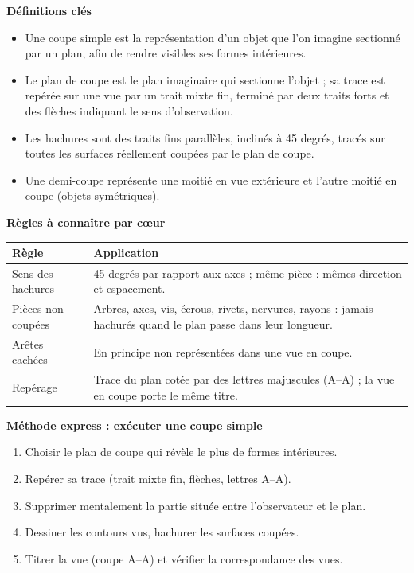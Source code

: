 \documentclass[11pt]{article}
\newcommand{\cle}[1]{{\popxbold\color{popdark}#1}}
\begin{document}
\begin{bilan}
\textbf{Définitions clés}
\begin{itemize}
\item Une \cle{coupe simple} est la représentation d'un objet que l'on imagine sectionné par un plan, afin de rendre visibles ses formes intérieures.
\item Le \cle{plan de coupe} est le plan imaginaire qui sectionne l'objet ; sa trace est repérée sur une vue par un trait mixte fin, terminé par deux traits forts et des flèches indiquant le sens d'observation.
\item Les \cle{hachures} sont des traits fins parallèles, inclinés à 45 degrés, tracés sur toutes les surfaces réellement coupées par le plan de coupe.
\item Une \cle{demi-coupe} représente une moitié en vue extérieure et l'autre moitié en coupe (objets symétriques).
\end{itemize}

\textbf{Règles à connaître par cœur}
\begin{center}
\begin{tabularx}{\linewidth}{|l|X|}\hline
\rowcolor{popblueL} \textbf{Règle} & \textbf{Application} \\ \hline
Sens des hachures & 45 degrés par rapport aux axes ; même pièce : mêmes direction et espacement. \\ \hline
Pièces non coupées & Arbres, axes, vis, écrous, rivets, nervures, rayons : jamais hachurés quand le plan passe dans leur longueur. \\ \hline
Arêtes cachées & En principe non représentées dans une vue en coupe. \\ \hline
Repérage & Trace du plan cotée par des lettres majuscules (A--A) ; la vue en coupe porte le même titre. \\ \hline
\end{tabularx}
\end{center}

\textbf{Méthode express : exécuter une coupe simple}
\begin{enumerate}
\item Choisir le plan de coupe qui révèle le plus de formes intérieures.
\item Repérer sa trace (trait mixte fin, flèches, lettres A--A).
\item Supprimer mentalement la partie située entre l'observateur et le plan.
\item Dessiner les contours vus, hachurer les surfaces coupées.
\item Titrer la vue (coupe A--A) et vérifier la correspondance des vues.
\end{enumerate}
\end{bilan}
\end{document}

